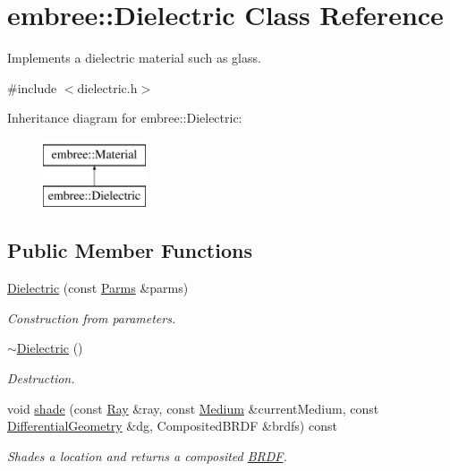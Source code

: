 \hypertarget{classembree_1_1_dielectric}{
\section{embree::Dielectric Class Reference}
\label{classembree_1_1_dielectric}
}


Implements a dielectric material such as glass.  




{\ttfamily \#include $<$dielectric.h$>$}

Inheritance diagram for embree::Dielectric:\begin{figure}[H]
\begin{center}
\leavevmode
\includegraphics[height=2.000000cm]{classembree_1_1_dielectric}
\end{center}
\end{figure}
\subsection*{Public Member Functions}
\begin{DoxyCompactItemize}
\item 
\hyperlink{classembree_1_1_dielectric_a72d973dc0956e0d66f191c2dac74a605}{Dielectric} (const \hyperlink{classembree_1_1_parms}{Parms} \&parms)
\begin{DoxyCompactList}\small\item\em Construction from parameters. \item\end{DoxyCompactList}\item 
\hypertarget{classembree_1_1_dielectric_a6f325ce381d1164eeda95fd9eac98439}{
\hyperlink{classembree_1_1_dielectric_a6f325ce381d1164eeda95fd9eac98439}{$\sim$Dielectric} ()}
\label{classembree_1_1_dielectric_a6f325ce381d1164eeda95fd9eac98439}

\begin{DoxyCompactList}\small\item\em Destruction. \item\end{DoxyCompactList}\item 
void \hyperlink{classembree_1_1_dielectric_a5e4ab074789a02d8de29881020829a76}{shade} (const \hyperlink{structembree_1_1_ray}{Ray} \&ray, const \hyperlink{classembree_1_1_medium}{Medium} \&currentMedium, const \hyperlink{structembree_1_1_differential_geometry}{DifferentialGeometry} \&dg, CompositedBRDF \&brdfs) const 
\begin{DoxyCompactList}\small\item\em Shades a location and returns a composited \hyperlink{classembree_1_1_b_r_d_f}{BRDF}. \item\end{DoxyCompactList}\end{DoxyCompactItemize}


